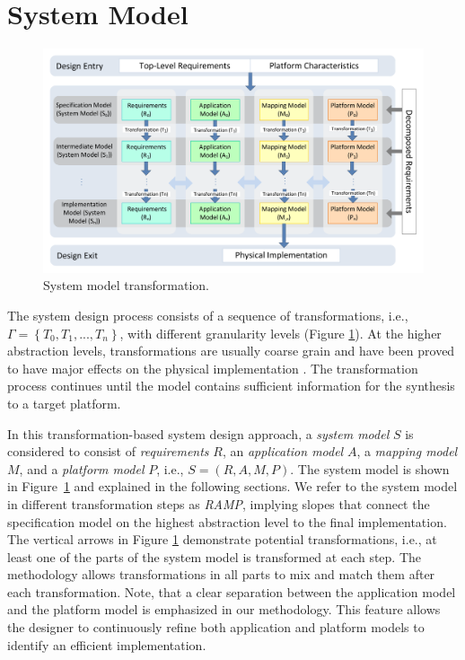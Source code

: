 \section{System Model}
\label{sec:system model}
\begin{figure}[t]
	\centering
   \includegraphics[width=\columnwidth]{figs-src/system-model.pdf}
	\caption{System model transformation.}
	\label{sequence}
\end{figure}

The system design process consists of a sequence of transformations, i.e., $\Gamma = \left \{T_0, T_1, ... , T_n \right\}$, with different granularity levels (Figure \ref{sequence}). At the higher abstraction levels, transformations are usually coarse grain and have been proved to have major effects on  the physical implementation \cite{kahng2009orion}. The transformation process continues until the model contains sufficient information for the synthesis to a target platform.   

In this transformation-based system design approach, a \textit{system model} $S$ is considered to consist of \textit{requirements} $R$, an \textit{application model} $A$, a \textit{mapping model} $M$, and a \textit{platform model} $P$, i.e., $S =(R,A,M,P)$. The system model is shown in Figure~\ref{sequence} and explained in the following sections. We refer to the system model in different transformation steps as \textit{RAMP}, implying slopes that connect the specification model on the highest abstraction level to the final implementation.  The vertical arrows in Figure \ref{sequence} demonstrate potential transformations, i.e., at least one of the parts of the system model is transformed at each step. The methodology allows transformations in all parts to mix and match them after each transformation.
Note, that a clear separation between the application model and the platform model is emphasized in our methodology. This feature allows the designer to continuously refine both application and platform models to identify an efficient implementation.

